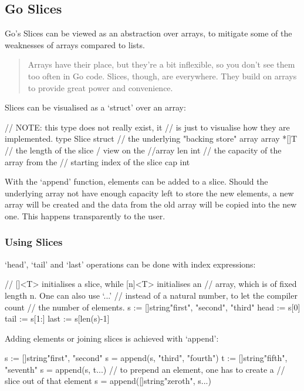 \subsection{Go Slices}

Go's Slices can be viewed as an abstraction over arrays, to mitigate some of the weaknesses of arrays
compared to lists.

\begin{quote}
    Arrays have their place, but they're a bit inflexible, so you don't see them too often in Go code.
    Slices, though, are everywhere. They build on arrays to provide great power and convenience.\autocite{golang-slices}
\end{quote}

Slices can be visualised as a `struct' over an array:

\begin{gocode}
// NOTE: this type does not really exist, it
// is just to visualise how they are implemented.
type Slice struct {
    // the underlying "backing store" array
    array *[]T
    // the length of the slice / view on the
    //array
    len   int
    // the capacity of the array from the
    // starting index of the slice
    cap   int
}
\end{gocode}

With the `append' function, elements can be added to a slice. Should the underlying array not have enough
capacity left to store the new elements, a new array will be created and the data from the old array will
be copied into the new one. This happens transparently to the user.

\subsubsection{Using Slices}

`head', `tail' and `last' operations can be done with index expressions:

\begin{gocode}
// []<T> initialises a slice, while [n]<T> initialises an
// array, which is of fixed length n. One can also use `...'
// instead of a natural number, to let the compiler count
// the number of elements.
s := []string{"first", "second", "third"}
head := s[0]
tail := s[1:]
last := s[len(s)-1]
\end{gocode}

Adding elements or joining slices is achieved with `append':

\begin{gocode}
s := []string{"first", "second"}
s = append(s, "third", "fourth")
t := []string{"fifth", "seventh"}
s = append(s, t...)
// to prepend an element, one has to create a
// slice out of that element
s = append([]string{"zeroth"}, s...)
\end{gocode}

